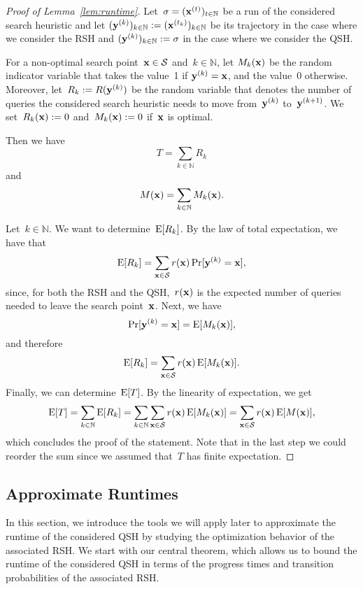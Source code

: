 \documentclass[a4paper,11pt]{article}
\begin{document}
\begin{proof}[Proof of Lemma~\ref{lem:runtime}]
Let~$\sigma=(\xvec[t])_{t\in\mathbb{N}}$ be a run of the considered search heuristic and let $(\yvec[k])_{k\in\mathbb{N}}:=(\xvec[t_k])_{k\in\mathbb{N}}$ be its trajectory in the case where we consider the RSH and $(\yvec[k])_{k\in\mathbb{N}}:=\sigma$ in the case where we consider the QSH.

For a non-optimal search point~$\xvec\in\mathcal{S}$ and~$k\in\mathbb{N}$, let $M_k(\xvec)$ be the random indicator variable that takes the value~1 if $\yvec[k]=\xvec$, and the value~0 otherwise. Moreover, let~$R_k:=R(\yvec[k])$ be the random variable that denotes the number of queries the considered search heuristic needs to move from~$\yvec[k]$ to~$\yvec[k+1]$. We set~$R_k(\xvec):=0$ and~$M_k(\xvec):=0$ if~$\xvec$ is optimal.

Then we have
\[
T=\sum_{k\in\mathbb{N}} R_k
\]
and
\[
M(\xvec)=\sum_{k\in\mathbb{N}} M_k(\xvec).
\]

Let~$k\in\mathbb{N}$. We want to determine~$\operatorname{E}[R_k]$. By the law of total expectation, we have that
\[
\EXP[R_k]=\sum_{\xvec\in\mathcal{S}}r(\xvec)\Pr[\yvec[k]=\xvec],
\]
since, for both the RSH and the QSH,~$r(\xvec)$ is the expected number of queries needed to leave the search point~$\xvec$. Next, we have
\[
\Pr[\yvec[k]=\xvec]=\EXP[M_k(\xvec)],
\]
and therefore
\[
\EXP[R_k]=\sum_{\xvec\in\mathcal{S}}r(\xvec)\EXP[M_k(\xvec)].
\]
Finally, we can determine~$\operatorname{E}[T]$. By the linearity of expectation, we get
\[
\EXP[T]
=\sum_{k\in\mathbb{N}}\EXP[R_k]
=\sum_{k\in\mathbb{N}}\sum_{\xvec\in\mathcal{S}}r(\xvec)\EXP[M_k(\xvec)]
=\sum_{\xvec\in\mathcal{S}}r(\xvec)\EXP[M(\xvec)],
\]
which concludes the proof of the statement. Note that in the last step we could reorder the sum since we assumed that~$T$ has finite expectation.
\end{proof}



\subsection{Approximate Runtimes}
\label{subsec:approximation}

In this section, we introduce the tools we will apply later to approximate the runtime of the considered QSH by studying the optimization behavior of the associated RSH. We start with our central theorem, which allows us to bound the runtime of the considered QSH in terms of the progress times and transition probabilities of the associated RSH.
\end{document}
